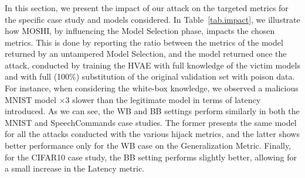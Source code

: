 

\subsubsection{}
\label{subsub:impact}
In this section, we present the impact of our attack on the targeted metrics for the specific case study and models considered. 
In Table~\ref{tab.impact}, we illustrate how MOSHI, by influencing the Model Selection phase, impacts the chosen metrics.
This is done by reporting the ratio between the metrics of the model returned by an untampered Model Selection, and the model returned once the attack, conducted by training the HVAE with full knowledge of the victim models and with full (100\%) substitution of the original validation set with poison data. 
For instance, when considering the white-box knowledge, we observed a malicious MNIST model $\times3$ slower than the legitimate model in terms of latency introduced.
As we can see, the WB and BB settings perform similarly in both the MNIST and SpeechCommands case studies.
The former presents the same model for all the attacks conducted with the various hijack metrics, and the latter shows better performance only for the WB case on the Generalization Metric.
Finally, for the CIFAR10 case study, the BB setting performs slightly better, allowing for a small increase in the Latency metric.

